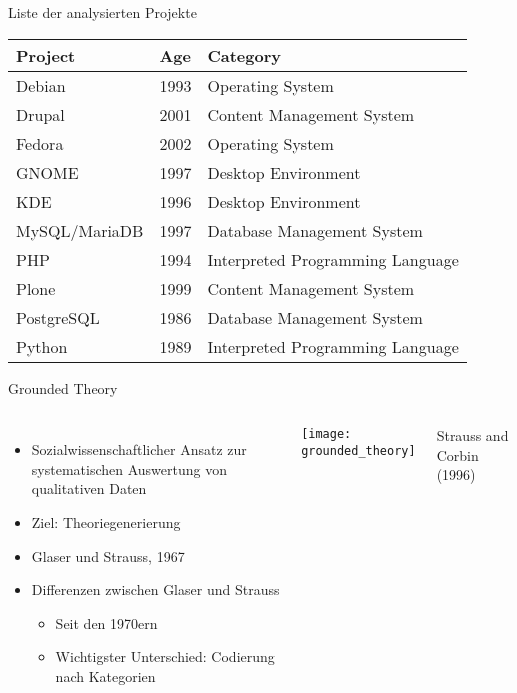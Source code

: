 \documentclass[11pt]{beamer}
\newcommand{\tableheadline}[1]{#1}
\newlength{\colwidth}
\begin{document}
\begin{frame}[t]{Liste der analysierten Projekte}
  \begin{center}
  \begin{tabularx}{\textwidth}{llX}
    \toprule
    \tableheadline{Project} & \tableheadline{Age} & \tableheadline{Category} \\
    \midrule
    Debian        & 1993 & Operating System \\
    Drupal        & 2001 & Content Management System \\
    Fedora        & 2002 & Operating System \\
    GNOME         & 1997 & Desktop Environment \\
    KDE           & 1996 & Desktop Environment \\
    MySQL/MariaDB & 1997 & Database Management System \\
    PHP           & 1994 & Interpreted Programming Language \\
    Plone         & 1999 & Content Management System \\
    PostgreSQL    & 1986 & Database Management System \\
    Python        & 1989 & Interpreted Programming Language \\
    \bottomrule
  \end{tabularx}

  \end{center}
\end{frame}

\begin{frame}[t]{Grounded Theory}
  \begin{columns}[T]
  \column{\colwidth}
    \begin{itemize}
      \item Sozialwissenschaftlicher Ansatz zur systematischen Auswertung von qualitativen Daten
      \item Ziel: Theoriegenerierung
      \item Glaser und Strauss, 1967
      \item Differenzen zwischen Glaser und Strauss
      \begin{itemize}
          \item Seit den 1970ern
          \item Wichtigster Unterschied: Codierung nach Kategorien
      \end{itemize}
    \end{itemize}
  \column{\colwidth}
    \texttt{[image: grounded\_theory]}

    {\tiny\hfill
    Strauss and Corbin (1996)
    }
  \end{columns}
\end{frame}
\end{document}
